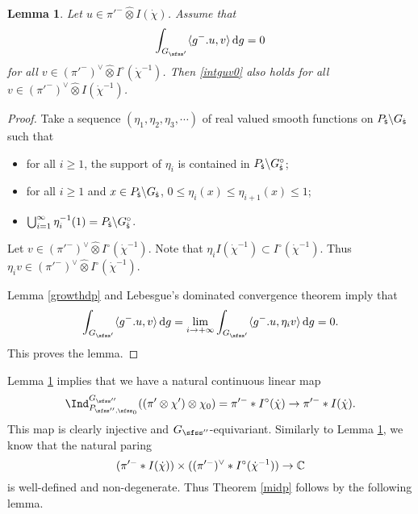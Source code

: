 \documentclass[12pt,a4paper]{amsart}
\newcommand{\od}{\operatorname{d}}
\newcommand{\la}{\langle}
\newcommand{\ra}{\rangle}
\numberwithin{equation}{section}
\newtheorem{lem}[thm]{Lemma}
\theoremstyle{remark}
\begin{document}
\begin{lem}\label{imb}
Let $u\in \pi'^- \widehat \otimes{ I(\dot \chi)}$. Assume that 
\begin{equation}\label{intguv0}
  \int_{G_{\sfss'}} \la g^-. u, v\ra\od\! g =0
\end{equation}
for all $v\in (\pi'^-)^\vee \widehat \otimes I^\circ (\dot \chi^{-1})$. Then \eqref{intguv0} also holds for all $v\in (\pi'^-)^\vee \widehat \otimes I(\dot \chi^{-1})$.
\end{lem}

\begin{proof}
Take a sequence $(\eta_1, \eta_2, \eta_3, \cdots)$ of real valued smooth functions on $P_{{\dot{\mathsf s}}}\backslash G_{{\dot{\mathsf s}}}$ such that
\begin{itemize}
\item
for all $i\geq 1$,  the support of $\eta_i$ is contained in $P_{\dot{\mathsf s}} \backslash  G_{\dot{\mathsf s}}^\circ$;
\item for all $i\geq 1$ and  $x\in  P_{{\dot{\mathsf s}}}\backslash G_{{\dot{\mathsf s}}}$, $ 0\leq  \eta_i(x)\leq \eta_{i+1}(x)\leq 1$; \smallskip
 \item
 $\bigcup_{i=1}^\infty \eta_i^{-1}(1)= P_{{\dot{\mathsf s}}}\backslash G_{{\dot{\mathsf s}}}^\circ$.
\end{itemize}
Let $v\in  (\pi'^-)^\vee \widehat \otimes I^\circ (\dot \chi^{-1})$. Note that $\eta_i  I (\dot \chi^{-1})\subset  I^\circ (\dot \chi^{-1})$. Thus $\eta_i v\in (\pi'^-)^\vee \widehat \otimes  I^\circ (\dot \chi^{-1})$.

Lemma \ref{growthdp} and  Lebesgue's dominated convergence theorem imply that
\[
  \int_{G_{\sfss'}} \la g^-. u, v\ra\od\! g
  =\lim_{i\rightarrow +\infty}  \int_{G_{\sfss'}} \la g^-. u, \eta_i v\ra \od\! g =0.
\]
This proves the lemma. 

\end{proof}

Lemma \ref{imb} implies that we have a natural continuous  linear map 
\[
 \Ind_{P_{\sfss'',\sfss_0}}^{G_{\sfss''}} ((\pi'\otimes  \chi')\otimes \chi_0)= \pi'^-* I^\circ (\dot \chi)\rightarrow \pi'^-* I(\dot \chi).
\]
This map is clearly  injective and $G_{\sfss''}$-equivariant. Similarly to Lemma \ref{imb}, we know that the natural paring 
\[
 ( \pi'^-* I(\dot \chi))\times( (\pi'^-)^\vee* I^\circ(\dot \chi^{-1}))\rightarrow \mathbb{C}
\]
is well-defined and non-degenerate. Thus Theorem \ref{midp} follows by the following lemma. 

\end{document}
